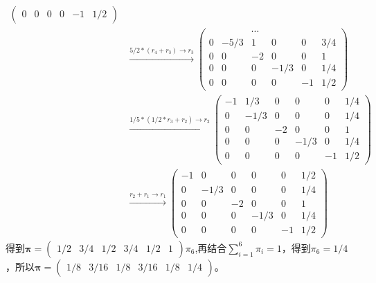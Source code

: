 \begin{enumerate}
\begin{align*}
\begin{pmatrix}
			      0 & 0 & 0      & 0    & -1 & 1/2
		      \end{pmatrix}                                  \\
		       & \overset{5/2*(r_4+r_3)\rightarrow r_3}{\longrightarrow }
		      \begin{pmatrix}
			        &      & \cdots &      &          \\
			      0 & -5/3 & 1      & 0    & 0  & 3/4 \\
			      0 & 0    & -2     & 0    & 0  & 1   \\
			      0 & 0    & 0      & -1/3 & 0  & 1/4 \\
			      0 & 0    & 0      & 0    & -1 & 1/2
		      \end{pmatrix}                                \\
		       & \overset{1/5*(1/2*r_3+r_2)\rightarrow r_2}{\longrightarrow }
		      \begin{pmatrix}
			      -1 & 1/3  & 0  & 0    & 0  & 1/4 \\
			      0  & -1/3 & 0  & 0    & 0  & 1/4 \\
			      0  & 0    & -2 & 0    & 0  & 1   \\
			      0  & 0    & 0  & -1/3 & 0  & 1/4 \\
			      0  & 0    & 0  & 0    & -1 & 1/2
		      \end{pmatrix}                                   \\
		       & \overset{r_2+r_1\rightarrow r_1}{\longrightarrow }
		      \begin{pmatrix}
			      -1 & 0    & 0  & 0    & 0  & 1/2 \\
			      0  & -1/3 & 0  & 0    & 0  & 1/4 \\
			      0  & 0    & -2 & 0    & 0  & 1   \\
			      0  & 0    & 0  & -1/3 & 0  & 1/4 \\
			      0  & 0    & 0  & 0    & -1 & 1/2
		      \end{pmatrix}
	      \end{align*}
	      得到\(\boldsymbol{\pi}=\begin{pmatrix}1/2& 3/4&1/2&3/4&1/2&1\end{pmatrix}\pi_6\),再结合\(\sum_{i=1}^{6}\pi_i=1\)，得到\(\pi_6=1/4\)，所以\(\boldsymbol{\pi}=\begin{pmatrix}1/8& 3/16&1/8&3/16&1/8&1/4\end{pmatrix}\)。


\end{enumerate}

